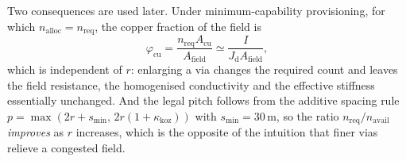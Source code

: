 \documentclass[journal]{IEEEtran}
\begin{document}
Two consequences are used later. Under minimum-capability provisioning, for which
$n_{\mathrm{alloc}} = n_{\mathrm{req}}$, the copper fraction of the field is
\begin{equation}
\varphi_{\mathrm{cu}} = \frac{n_{\mathrm{req}} A_{\mathrm{cu}}}{A_{\mathrm{field}}}
 \simeq \frac{I}{J_{\mathrm{d}} A_{\mathrm{field}}},
\label{eq:phi}
\end{equation}
which is independent of $r$: enlarging a via changes the required count and leaves the field
resistance, the homogenised conductivity and the effective stiffness essentially unchanged.
And the legal pitch follows from the additive spacing rule
$p = \max(2r + s_{\min},\, 2r(1+\kappa_{\mathrm{koz}}))$ with $s_{\min} = 30$\,\textmu m, so
the ratio $n_{\mathrm{req}}/n_{\mathrm{avail}}$ \emph{improves} as $r$ increases, which is
the opposite of the intuition that finer vias relieve a congested field.
\end{document}
